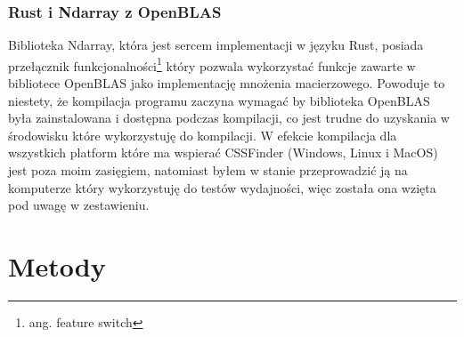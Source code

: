 \documentclass[11pt, a4paper]{article}
\begin{document}
\begin{sloppypar}
    \subsubsection{Rust i Ndarray z OpenBLAS}
    Biblioteka Ndarray, która jest sercem implementacji w języku Rust, posiada
    przełącznik funkcjonalności\footnote{ang. feature switch} który pozwala wykorzystać funkcje
    zawarte w bibliotece OpenBLAS jako implementację mnożenia macierzowego. Powoduje to
    niestety, że kompilacja programu zaczyna wymagać by biblioteka OpenBLAS była zainstalowana
    i dostępna podczas kompilacji, co jest trudne do uzyskania w środowisku które
    wykorzystuję do kompilacji. W efekcie kompilacja dla wszystkich platform które ma wspierać
    CSSFinder (Windows, Linux i MacOS) jest poza moim zasięgiem, natomiast byłem w stanie
    przeprowadzić ją na komputerze który wykorzystuję do testów wydajności, więc została
    ona wzięta pod uwagę w zestawieniu.

    \section{Metody}


\end{sloppypar}
\end{document}
